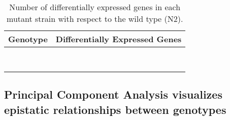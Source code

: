 \begin{table}[tbhp]
  \centering
  \begin{tabular}{lr}
    \toprule{}
    Genotype & Differentially Expressed Genes\\
    \midrule{}\egl{} & \egln{}\\
    \rhy{} & \rhyn{}\\
    \vhl{} & \vhln{}\\
    \hif{} & \hifn{}\\
    \eglvhl{} & \eglvhln{}\\
    \eglhif{} & \eglhifn{}\\
    \fog{} & \fogn{}\\
    \bottomrule{}
  \end{tabular}
  \caption{Number of differentially expressed genes in each mutant strain with
  respect to the wild type (N2).}
\label{tab:genes}
\end{table}

\subsection*{Principal Component Analysis visualizes epistatic relationships
             between genotypes}
\label{sub:Clustering}


